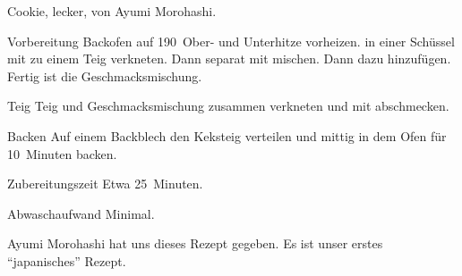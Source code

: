 \begin{recipe}{Cookie, lecker, von Ayumi Morohashi.}
	\item[Vorbereitung] Backofen auf 190\textcelsius~Ober- und Unterhitze vorheizen.
	 in einer Schüssel mit
	 zu einem Teig verkneten. Dann separat
	 mit
	 mischen. Dann dazu
	 hinzufügen. Fertig ist die Geschmacksmischung.
	\item[Teig] Teig und Geschmacksmischung zusammen verkneten und mit 
	 abschmecken.
	\item[Backen] Auf einem Backblech den Keksteig verteilen und mittig in dem Ofen für 10~Minuten backen.
	\item[Zubereitungszeit] Etwa 25~Minuten.
	\item[Abwaschaufwand] Minimal.
\end{recipe}
Ayumi Morohashi hat uns dieses Rezept gegeben. Es ist unser erstes \enquote{japanisches} Rezept.
